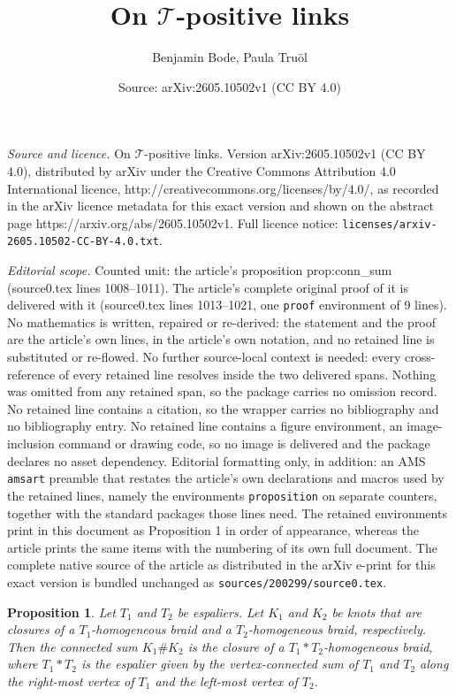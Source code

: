 \documentclass[10pt,a4paper]{amsart}
\title{On $\mathcal{T}$-positive links}
\author{Benjamin Bode, Paula Tru\"ol}
\date{Source: arXiv:2605.10502v1 (CC BY 4.0)}
\newtheorem{proposition}{Proposition}
\begin{document}
\maketitle

\noindent\emph{Source and licence.} On $\mathcal{T}$-positive links. Version arXiv:2605.10502v1 (CC BY 4.0), distributed by arXiv under the Creative Commons Attribution 4.0 International licence, http://creativecommons.org/licenses/by/4.0/, as recorded in the arXiv licence metadata for this exact version and shown on the abstract page https://arxiv.org/abs/2605.10502v1. Full licence notice: \texttt{licenses/arxiv-2605.10502-CC-BY-4.0.txt}.\par\smallskip

\noindent\textit{Editorial scope.} Counted unit: the article's proposition prop:conn\_sum (source0.tex lines 1008--1011). The article's complete original proof of it is delivered with it (source0.tex lines 1013--1021, one \texttt{proof} environment of 9 lines). No mathematics is written, repaired or re-derived: the statement and the proof are the article's own lines, in the article's own notation, and no retained line is substituted or re-flowed.  No further source-local context is needed: every cross-reference of every retained line resolves inside the two delivered spans.  Nothing was omitted from any retained span, so the package carries no omission record.  No retained line contains a citation, so the wrapper carries no bibliography and no bibliography entry.  No retained line contains a figure environment, an image-inclusion command or drawing code, so no image is delivered and the package declares no asset dependency.  Editorial formatting only, in addition: an AMS \texttt{amsart} preamble that restates the article's own declarations and macros used by the retained lines, namely the environments \texttt{proposition} on separate counters, together with the standard packages those lines need.  The retained environments print in this document as Proposition 1 in order of appearance, whereas the article prints the same items with the numbering of its own full document.  The complete native source of the article as distributed in the arXiv e-print for this exact version is bundled unchanged as \texttt{sources/200299/source0.tex}.
\begin{proposition}\label{prop:conn_sum}
Let $T_1$ and $T_2$ be espaliers.
Let $K_1$ and $K_2$ be knots that are closures of a $T_1$-homogeneous braid and a $T_2$-homogeneous braid, respectively. Then the connected sum $K_1\# K_2$ is the closure of a $T_1*T_2$-homogeneous braid, where $T_1\ast T_2$ is the espalier given by the vertex-connected sum of $T_1$ and $T_2$ along the right-most vertex of $T_1$ and the left-most vertex of $T_2$.
\end{proposition}
\end{document}
